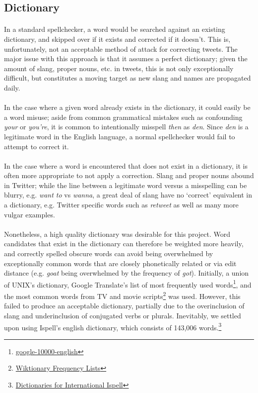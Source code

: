 \documentclass[twocolumn,10pt]{article}
\begin{document}
\subsection*{Dictionary}
\paragraph{} In a standard spellchecker, a word would be searched against an existing dictionary, and skipped over if it exists and corrected if it doesn't. This is, unfortunately, not an acceptable method of attack for correcting tweets. The major issue with this approach is that it assumes a perfect dictionary; given the amount of slang, proper nouns, etc. in tweets, this is not only exceptionally difficult, but constitutes a moving target as new slang and names are propagated daily.
\paragraph{} In the case where a given word already exists in the dictionary, it could easily be a word misuse; aside from common grammatical mistakes such as confounding \textit{your} or \textit{you're}, it is common to intentionally misspell \textit{then} as \textit{den}. Since \textit{den} is a legitimate word in the English language, a normal spellchecker would fail to attempt to correct it. 
\paragraph{} In the case where a word is encountered that does not exist in a dictionary, it is often more appropriate to not apply a correction. Slang and proper nouns abound in Twitter; while the line between a legitimate word versus a misspelling can be blurry, e.g. \textit{want to} vs \textit{wanna}, a great deal of slang have no `correct' equivalent in a dictionary, e.g. Twitter specific words such as \textit{retweet} as well as many more vulgar examples.
\paragraph{}Nonetheless, a high quality dictionary was desirable for this project. Word candidates that exist in the dictionary can therefore be weighted more heavily, and correctly spelled obscure words can avoid being overwhelmed by exceptionally common words that are closely phonetically related or via edit distance (e.g. \textit{goat} being overwhelmed by the frequency of \textit{got}). Initially, a union of UNIX's dictionary, Google Translate's list of most frequently used words\footnote{\href{https://github.com/first20hours/google-10000-english}{google-10000-english}}, and the most common words from TV and movie scripts\footnote{\href{http://en.wiktionary.org/wiki/Wiktionary:Frequency_lists\#TV_and_movie_scripts}{Wiktionary Frequency Lists}} was used. However, this failed to produce an acceptable dictionary, partially due to the overinclusion of slang and underinclusion of conjugated verbs or plurals. Inevitably, we settled upon using Ispell's english dictionary, which consists of 143,006 words.\footnote{\href{http://fmg-www.cs.ucla.edu/geoff/ispell-dictionaries.html}{Dictionaries for International Ispell}}
\end{document}
